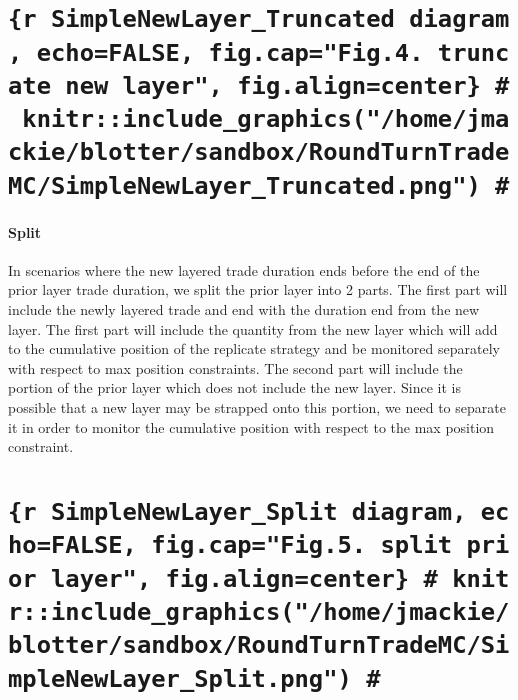 \hypertarget{r-simplenewlayer_truncated-diagram-echofalse-fig.capfig.4.-truncate-new-layer-fig.aligncenter-knitrinclude_graphicshomejmackieblottersandboxroundturntrademcsimplenewlayer_truncated.png}{%
\section{\texorpdfstring{\texttt{\{r\ SimpleNewLayer\_Truncated\ diagram,\ echo=FALSE,\ fig.cap="Fig.4.\ truncate\ new\ layer",\ fig.align=\textquotesingle{}center\textquotesingle{}\}\ \#\ knitr::include\_graphics("/home/jmackie/blotter/sandbox/RoundTurnTradeMC/SimpleNewLayer\_Truncated.png")\ \#}}{\{r SimpleNewLayer\_Truncated diagram, echo=FALSE, fig.cap="Fig.4. truncate new layer", fig.align='center'\} \# knitr::include\_graphics("/home/jmackie/blotter/sandbox/RoundTurnTradeMC/SimpleNewLayer\_Truncated.png") \#}}\label{r-simplenewlayer_truncated-diagram-echofalse-fig.capfig.4.-truncate-new-layer-fig.aligncenter-knitrinclude_graphicshomejmackieblottersandboxroundturntrademcsimplenewlayer_truncated.png}}

\hypertarget{split}{%
\paragraph{Split}\label{split}}

In scenarios where the new layered trade duration ends before the end of
the prior layer trade duration, we split the prior layer into 2 parts.
The first part will include the newly layered trade and end with the
duration end from the new layer. The first part will include the
quantity from the new layer which will add to the cumulative position of
the replicate strategy and be monitored separately with respect to max
position constraints. The second part will include the portion of the
prior layer which does not include the new layer. Since it is possible
that a new layer may be strapped onto this portion, we need to separate
it in order to monitor the cumulative position with respect to the max
position constraint.

\hypertarget{r-simplenewlayer_split-diagram-echofalse-fig.capfig.5.-split-prior-layer-fig.aligncenter-knitrinclude_graphicshomejmackieblottersandboxroundturntrademcsimplenewlayer_split.png}{%
\section{\texorpdfstring{\texttt{\{r\ SimpleNewLayer\_Split\ diagram,\ echo=FALSE,\ fig.cap="Fig.5.\ split\ prior\ layer",\ fig.align=\textquotesingle{}center\textquotesingle{}\}\ \#\ knitr::include\_graphics("/home/jmackie/blotter/sandbox/RoundTurnTradeMC/SimpleNewLayer\_Split.png")\ \#}}{\{r SimpleNewLayer\_Split diagram, echo=FALSE, fig.cap="Fig.5. split prior layer", fig.align='center'\} \# knitr::include\_graphics("/home/jmackie/blotter/sandbox/RoundTurnTradeMC/SimpleNewLayer\_Split.png") \#}}\label{r-simplenewlayer_split-diagram-echofalse-fig.capfig.5.-split-prior-layer-fig.aligncenter-knitrinclude_graphicshomejmackieblottersandboxroundturntrademcsimplenewlayer_split.png}}

